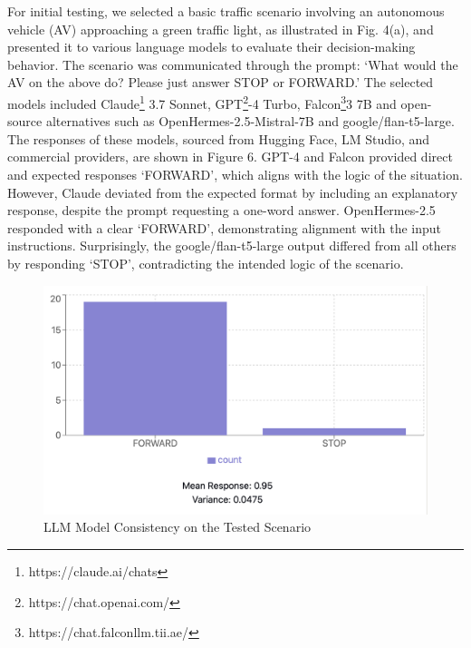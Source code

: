 \documentclass[conference]{IEEEtran}
\begin{document}
For initial testing, we selected a basic traffic scenario involving an autonomous vehicle (AV) approaching a green traffic light, as illustrated in Fig. 4(a), and presented it to various language models to evaluate their decision-making behavior. The scenario was communicated through the prompt: `What would the AV on the above do? Please just answer STOP or FORWARD.' The selected models included Claude\footnote{https://claude.ai/chats} 3.7 Sonnet, GPT\footnote{https://chat.openai.com/}-4 Turbo, Falcon\footnote{https://chat.falconllm.tii.ae/}3 7B and open-source alternatives such as OpenHermes-2.5-Mistral-7B and google/flan-t5-large. The responses of these models, sourced from Hugging Face, LM Studio, and commercial providers, are shown in Figure 6. GPT-4 and Falcon provided direct and expected responses `FORWARD', which aligns with the logic of the situation. However, Claude deviated from the expected format by including an explanatory response, despite the prompt requesting a one-word answer. OpenHermes-2.5 responded with a clear `FORWARD', demonstrating alignment with the input instructions. Surprisingly, the google/flan-t5-large output differed from all others by responding `STOP', contradicting the intended logic of the scenario.
 \begin{figure}[ht]
     \centering
     \includegraphics[width=\linewidth]{Fig/chart.png}
     \caption{LLM Model Consistency on the Tested Scenario}
     \label{fig:enter-label}
 \end{figure}
 
\end{document}
